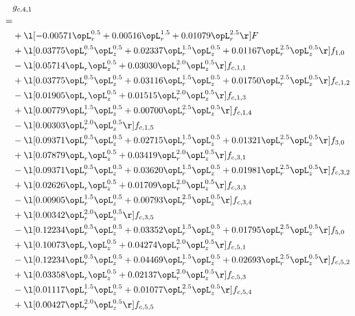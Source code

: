 \begin{alignat}{2} 
\label{eq:g_41_0} 
& g_{c,4,1} \nonumber \\ 
 = \\ 
& + \l[  -0.00571 \opL_r^{0.5} +  0.00516 \opL_r^{1.5} +  0.01079 \opL_r^{2.5}  \r] F \nonumber \\ 
& + \l[  0.03775 \opL_r^{0.5} \opL_z^{0.5} +  0.02337 \opL_r^{1.5} \opL_z^{0.5} +  0.01167 \opL_r^{2.5} \opL_z^{0.5}  \r] f_{1,0} \nonumber \\ 
& - \l[  0.05714 \opL_r \opL_z^{0.5} +  0.03030 \opL_r^{2.0} \opL_z^{0.5}  \r] f_{c,1,1} \nonumber \\ 
& + \l[  0.03775 \opL_r^{0.5} \opL_z^{0.5} +  0.03116 \opL_r^{1.5} \opL_z^{0.5} +  0.01750 \opL_r^{2.5} \opL_z^{0.5}  \r] f_{c,1,2} \nonumber \\ 
& - \l[  0.01905 \opL_r \opL_z^{0.5} +  0.01515 \opL_r^{2.0} \opL_z^{0.5}  \r] f_{c,1,3} \nonumber \\ 
& + \l[  0.00779 \opL_r^{1.5} \opL_z^{0.5} +  0.00700 \opL_r^{2.5} \opL_z^{0.5}  \r] f_{c,1,4} \nonumber \\ 
& - \l[  0.00303 \opL_r^{2.0} \opL_z^{0.5}  \r] f_{c,1,5} \nonumber \\ 
& - \l[  0.09371 \opL_r^{0.5} \opL_z^{0.5} +  0.02715 \opL_r^{1.5} \opL_z^{0.5} +  0.01321 \opL_r^{2.5} \opL_z^{0.5}  \r] f_{3,0} \nonumber \\ 
& + \l[  0.07879 \opL_r \opL_z^{0.5} +  0.03419 \opL_r^{2.0} \opL_z^{0.5}  \r] f_{c,3,1} \nonumber \\ 
& - \l[  0.09371 \opL_r^{0.5} \opL_z^{0.5} +  0.03620 \opL_r^{1.5} \opL_z^{0.5} +  0.01981 \opL_r^{2.5} \opL_z^{0.5}  \r] f_{c,3,2} \nonumber \\ 
& + \l[  0.02626 \opL_r \opL_z^{0.5} +  0.01709 \opL_r^{2.0} \opL_z^{0.5}  \r] f_{c,3,3} \nonumber \\ 
& - \l[  0.00905 \opL_r^{1.5} \opL_z^{0.5} +  0.00793 \opL_r^{2.5} \opL_z^{0.5}  \r] f_{c,3,4} \nonumber \\ 
& + \l[  0.00342 \opL_r^{2.0} \opL_z^{0.5}  \r] f_{c,3,5} \nonumber \\ 
& - \l[  0.12234 \opL_r^{0.5} \opL_z^{0.5} +  0.03352 \opL_r^{1.5} \opL_z^{0.5} +  0.01795 \opL_r^{2.5} \opL_z^{0.5}  \r] f_{5,0} \nonumber \\ 
& + \l[  0.10073 \opL_r \opL_z^{0.5} +  0.04274 \opL_r^{2.0} \opL_z^{0.5}  \r] f_{c,5,1} \nonumber \\ 
& - \l[  0.12234 \opL_r^{0.5} \opL_z^{0.5} +  0.04469 \opL_r^{1.5} \opL_z^{0.5} +  0.02693 \opL_r^{2.5} \opL_z^{0.5}  \r] f_{c,5,2} \nonumber \\ 
& + \l[  0.03358 \opL_r \opL_z^{0.5} +  0.02137 \opL_r^{2.0} \opL_z^{0.5}  \r] f_{c,5,3} \nonumber \\ 
& - \l[  0.01117 \opL_r^{1.5} \opL_z^{0.5} +  0.01077 \opL_r^{2.5} \opL_z^{0.5}  \r] f_{c,5,4} \nonumber \\ 
& + \l[  0.00427 \opL_r^{2.0} \opL_z^{0.5}  \r] f_{c,5,5} \nonumber \\ 
\end{alignat} 


